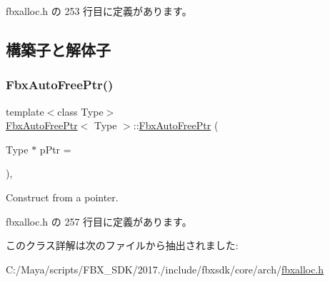  fbxalloc.\+h の 253 行目に定義があります。



\subsection{構築子と解体子}
\mbox{\label{class_fbx_auto_free_ptr_a02473c8a84df8d8fb6803a2d4224819d}} 
\subsubsection{\texorpdfstring{Fbx\+Auto\+Free\+Ptr()}{FbxAutoFreePtr()}}
{\footnotesize\ttfamily template$<$class Type$>$ \\
\hyperlink{class_fbx_auto_free_ptr}{Fbx\+Auto\+Free\+Ptr}$<$ Type $>$\+::\hyperlink{class_fbx_auto_free_ptr}{Fbx\+Auto\+Free\+Ptr} (\begin{DoxyParamCaption}\item[{Type $\ast$}]{p\+Ptr = {} }\end{DoxyParamCaption})\hspace{0.3cm}{\ttfamily [inline]}, {\ttfamily [explicit]}}



Construct from a pointer. 



 fbxalloc.\+h の 257 行目に定義があります。



このクラス詳解は次のファイルから抽出されました\+:\begin{DoxyCompactItemize}
\item 
C\+:/\+Maya/scripts/\+F\+B\+X\+\_\+\+S\+D\+K/2017./include/fbxsdk/core/arch/\hyperlink{fbxalloc_8h}{fbxalloc.\+h}\end{DoxyCompactItemize}
